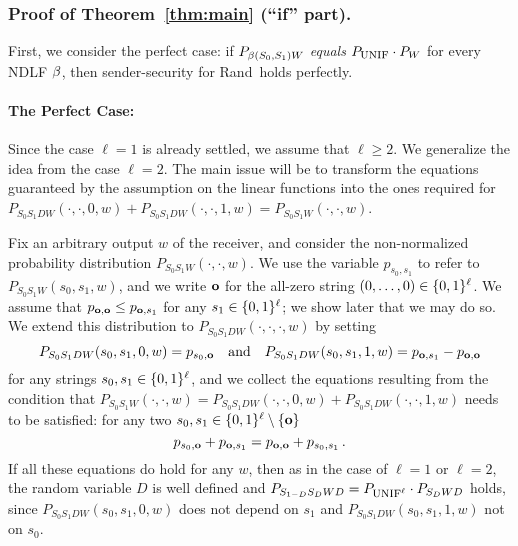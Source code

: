 \subsubsection{Proof of Theorem~\ref{thm:main} (``if'' part). }

First, we consider the perfect case: if $P_{\beta(S_0,S_1) W}$ {\em
  equals} $P_{\mbox{\sc unif}} \cdot P_{W}$ for every NDLF $\beta$, then
  sender-security for Rand\ \lStringOT holds perfectly.

\paragraph{\sc The Perfect Case: }

Since the case $\ell = 1$ is already settled, we assume that $\ell
\geq 2$.  We generalize the idea from the case $\ell = 2$. The main
issue will be to transform the equations guaranteed by the assumption
on the linear functions into the ones required for $P_{S_0 S_1 D
  W}(\cdot,\cdot,0,w)+P_{S_0 S_1 D W}(\cdot,\cdot,1,w)=P_{S_0 S_1
  W}(\cdot,\cdot,w)$.

Fix an arbitrary output $w$ of the receiver, and consider the
non-normalized probability distribution $P_{S_0 S_1
  W}(\cdot,\cdot,w)$.
We use the variable $p_{s_0,s_1}$ to refer to $P_{S_0 S_1
  W}(s_0,s_1,w)$, and we write $\text{\boldmath${\bf o}$}$ for the all-zero string $(0,\ldots,0)
\in \{0,1\}^{\ell}$. We assume that $p_{\text{\boldmath${\bf o}$},\text{\boldmath${\bf o}$}} \leq
p_{\text{\boldmath${\bf o}$},s_1}$ for any \mbox{$s_1 \in \{0,1\}^{\ell}$}; we show
later that we may do so. We extend this distribution to $P_{S_0 S_1 D
  W}(\cdot,\cdot,\cdot,w)$ by setting
\begin{equation}\label{eq:extension}
P_{S_0 S_1 D W}(s_0,s_1,0,w) = p_{s_0,\text{\boldmath${\bf o}$}}
\quad\text{and}\quad
P_{S_0 S_1 D W}(s_0,s_1,1,w) = p_{\text{\boldmath${\bf o}$},s_1}-p_{\text{\boldmath${\bf o}$},\text{\boldmath${\bf o}$}}
\end{equation}
for any strings $s_0,s_1 \in \{0,1\}^{\ell}$, and we collect the
equations resulting from the condition that $P_{S_0 S_1
  W}(\cdot,\cdot,w) = P_{S_0 S_1 D W}(\cdot,\cdot,0,w)+P_{S_0 S_1 D
  W}(\cdot,\cdot,1,w)$ needs to be satisfied: for any two $s_0,s_1 \in \{0,1\}^{\ell}
\setminus \{\text{\boldmath${\bf o}$}\}$
\begin{equation}\label{eq:original}
p_{s_0,\text{\boldmath${\bf o}$}} + p_{\text{\boldmath${\bf o}$},s_1} = p_{\text{\boldmath${\bf o}$},\text{\boldmath${\bf o}$}} + p_{s_0,s_1} \, .
\end{equation}
If all these equations do hold for any $w$, then as in the case of
$\ell = 1$ or $\ell = 2$, the random variable $D$ is well defined and
$P_{S_{1-D} S_D W D} = P_{\mbox{\sc unif}^{\ell}} \cdot P_{S_D W D}$ holds,
since $P_{S_0 S_1 D W}(s_0,s_1,0,w)$ does not depend on $s_1$ and
$P_{S_0 S_1 D W}(s_0,s_1,1,w)$ not on $s_0$.

